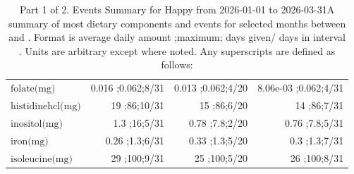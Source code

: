 \begin{table}[H]
\begin{tabular}{|l|r|r|r|}
$\textrm{folate(mg)}$&0.016 ;0.062;8/31&0.013 ;0.062;4/20&8.06e-03 ;0.062;4/31\\
$\textrm{histidinehcl(mg)}$&19 ;86;10/31&15 ;86;6/20&14 ;86;7/31\\
$\textrm{inositol(mg)}$&1.3 ;16;5/31&0.78 ;7.8;2/20&0.76 ;7.8;5/31\\
$\textrm{iron(mg)}$&0.26 ;1.3;6/31&0.33 ;1.3;5/20&0.3 ;1.3;7/31\\
$\textrm{isoleucine(mg)}$&29 ;100;9/31&25 ;100;5/20&26 ;100;8/31\\
\hline
\end{tabular}
\caption{Part 1 of 2.  Events Summary for Happy   from 2026-01-01 to 2026-03-31A summary of most dietary components and events  for selected months between \mjmdateminn and \mjmdatemaxn. Format is average daily amount ;maximum; days given/ days in interval . Units are arbitrary except where noted. Any  superscripts are defined as follows:  \mjmsuperscriptsn}
\end{table}
